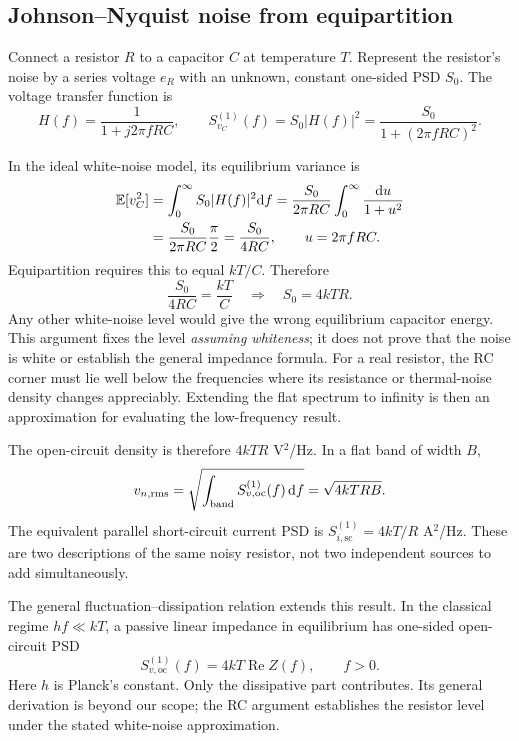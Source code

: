 \subsection{Johnson--Nyquist noise from equipartition}
Connect a resistor $R$ to a capacitor $C$ at temperature $T$. Represent the resistor's noise by a series voltage $e_R$ with an unknown, constant one-sided PSD $S_0$. The voltage transfer function is
\[
H(f)=\frac1{1+j2\pi fRC},\qquad
S_{v_C}^{(1)}(f)=S_0|H(f)|^2=\frac{S_0}{1+(2\pi fRC)^2}.
\]
\RCFigure

In the ideal white-noise model, its equilibrium variance is
\begin{align*}
\mathbb E[v_C^2]
&=\int_0^\infty S_0|H(f)|^2\mathrm d f
=\frac{S_0}{2\pi RC}\int_0^\infty\frac{\mathrm d u}{1+u^2}\\
&=\frac{S_0}{2\pi RC}\frac\pi2
=\frac{S_0}{4RC},\qquad u=2\pi fRC.
\end{align*}
Equipartition requires this to equal $kT/C$. Therefore
\[
\frac{S_0}{4RC}=\frac{kT}{C}
\quad\Longrightarrow\quad
\boxed{S_0=4kTR.}
\]
Any other white-noise level would give the wrong equilibrium capacitor energy. This argument fixes the level \emph{assuming whiteness}; it does not prove that the noise is white or establish the general impedance formula. For a real resistor, the RC corner must lie well below the frequencies where its resistance or thermal-noise density changes appreciably. Extending the flat spectrum to infinity is then an approximation for evaluating the low-frequency result.

The open-circuit density is therefore $4kTR$ V$^2$/Hz. In a flat band of width $B$,
\begin{equation}
v_{n,\mathrm{rms}}=\sqrt{\int_{\mathrm{band}}S_{v,\mathrm{oc}}^{(1)}(f)\,\mathrm d f}
=\sqrt{4kTRB}.\label{eq:resistor-rms}
\end{equation}
The equivalent parallel short-circuit current PSD is $S_{i,\mathrm{sc}}^{(1)}=4kT/R$ A$^2$/Hz. These are two descriptions of the same noisy resistor, not two independent sources to add simultaneously.

The general fluctuation--dissipation relation extends this result. In the classical regime $hf\ll kT$, a passive linear impedance in equilibrium has one-sided open-circuit PSD
\begin{equation}
\boxed{S_{v,\mathrm{oc}}^{(1)}(f)=4kT\operatorname{Re}Z(f),\qquad f>0.}
\label{eq:fdt}
\end{equation}
Here $h$ is Planck's constant. Only the dissipative part contributes. Its general derivation is beyond our scope; the RC argument establishes the resistor level under the stated white-noise approximation.

